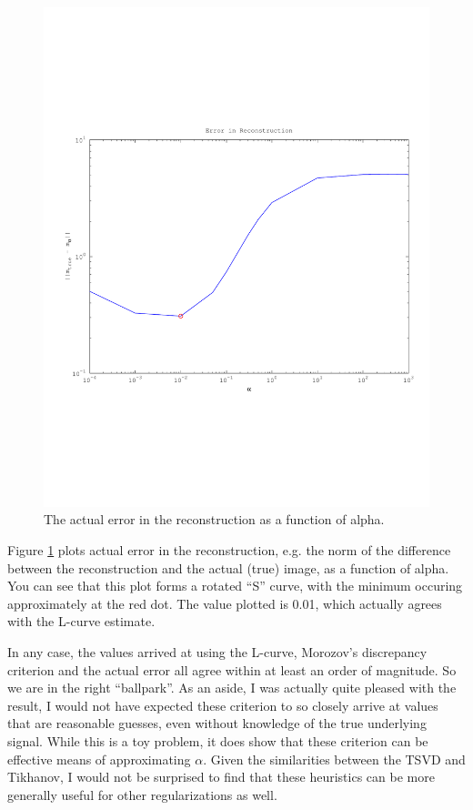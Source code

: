 \documentclass{article}
\begin{document}
\begin{figure}[!htb]
  \includegraphics[scale=.5]{plots/true1d.pdf}
  \caption{The actual error in the reconstruction as a function of
 alpha. } 
 \label{fig:actual}
\end{figure}

Figure \ref{fig:actual} plots actual error in the reconstruction,
e.g. the norm of the difference between the reconstruction and the
actual (true) image, as a function of alpha. You can see that this
plot forms a rotated ``S'' curve, with the minimum occuring
approximately at the red dot. The value plotted is 0.01,
which actually agrees with the L-curve estimate. 

In any case, the values arrived at using the L-curve, Morozov's
discrepancy criterion and the actual error all agree within at least an
order of magnitude. So we are in the right ``ballpark''. As an aside, I
was actually quite pleased with the result, I would not have expected
these criterion to so closely arrive at values that are reasonable
guesses, even without knowledge of the true underlying signal. While
this is a toy problem, it does show that these criterion can be
effective means of approximating $\alpha$. Given the similarities
between the TSVD and Tikhanov, I would not be surprised to find that
these heuristics can be more generally useful for other regularizations as well. 
\end{document}

